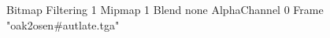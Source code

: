 {Bitmap
	{Filtering 1}
	{Mipmap 1}
	{Blend none}
	{AlphaChannel 0}
	{Frame "oak2osen#autlate.tga"}
}
